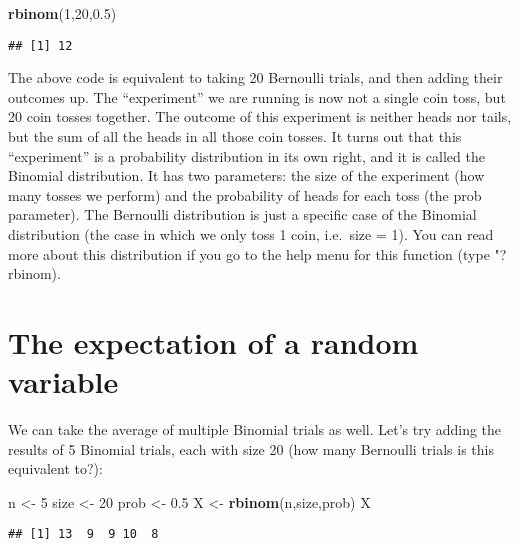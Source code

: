 \documentclass[
]{book}
\newenvironment{Shaded}{\begin{snugshade}}{\end{snugshade}}
\newcommand{\DecValTok}[1]{\textcolor[rgb]{0.00,0.00,0.81}{#1}}
\newcommand{\FloatTok}[1]{\textcolor[rgb]{0.00,0.00,0.81}{#1}}
\newcommand{\KeywordTok}[1]{\textcolor[rgb]{0.13,0.29,0.53}{\textbf{#1}}}
\newcommand{\NormalTok}[1]{#1}
\newcommand{\StringTok}[1]{\textcolor[rgb]{0.31,0.60,0.02}{#1}}
\begin{document}
\begin{Shaded}
\begin{Highlighting}[]
\KeywordTok{rbinom}\NormalTok{(}\DecValTok{1}\NormalTok{,}\DecValTok{20}\NormalTok{,}\FloatTok{0.5}\NormalTok{)}
\end{Highlighting}
\end{Shaded}

\begin{verbatim}
## [1] 12
\end{verbatim}

The above code is equivalent to taking 20 Bernoulli trials, and then adding their outcomes up. The ``experiment'' we are running is now not a single coin toss, but 20 coin tosses together. The outcome of this experiment is neither heads nor tails, but the sum of all the heads in all those coin tosses. It turns out that this ``experiment'' is a probability distribution in its own right, and it is called the Binomial distribution. It has two parameters: the size of the experiment (how many tosses we perform) and the probability of heads for each toss (the prob parameter). The Bernoulli distribution is just a specific case of the Binomial distribution (the case in which we only toss 1 coin, i.e.~size = 1). You can read more about this distribution if you go to the help menu for this function (type "?rbinom).

\hypertarget{the-expectation-of-a-random-variable}{%
\section{The expectation of a random variable}\label{the-expectation-of-a-random-variable}}

We can take the average of multiple Binomial trials as well. Let's try adding the results of 5 Binomial trials, each with size 20 (how many Bernoulli trials is this equivalent to?):

\begin{Shaded}
\begin{Highlighting}[]
\NormalTok{n \textless{}{-}}\StringTok{ }\DecValTok{5}
\NormalTok{size \textless{}{-}}\StringTok{ }\DecValTok{20}
\NormalTok{prob \textless{}{-}}\StringTok{ }\FloatTok{0.5}
\NormalTok{X \textless{}{-}}\StringTok{ }\KeywordTok{rbinom}\NormalTok{(n,size,prob)}
\NormalTok{X}
\end{Highlighting}
\end{Shaded}

\begin{verbatim}
## [1] 13  9  9 10  8
\end{verbatim}
\end{document}
